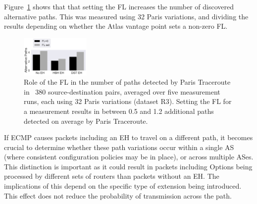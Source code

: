 \documentclass[conference]{IEEEtran}
\begin{document}
Figure~\ref{fig:paths-fl} shows that that setting the FL increases the number of discovered alternative paths.
This was measured using 32 Paris variations, and dividing the results depending on whether the Atlas vantage point sets a non-zero FL.

\begin{figure}[t]
\centering
  \includegraphics[width=0.3\textwidth]{FL.png}
  \caption{Role of the FL in the number of paths detected by Paris Traceroute in ~380
source-destination pairs, averaged over five measurement runs, each using 32 Paris variations (dataset R3). Setting the FL for a measurement results in between 0.5 and 1.2 additional paths detected on average by Paris Traceroute.}
  \label{fig:paths-fl}
\end{figure}




If ECMP causes packets including an EH to travel on a different path, it
becomes crucial to determine whether these path variations occur within a
single AS (where consistent configuration policies may be in
place), or across multiple ASes. This distinction is important as it could
result in packets including Options being processed by different sets of routers than packets
without an EH. The implications of this depend on the specific type of
extension being introduced. This effect
does not reduce the probability of transmission across the path.
\end{document}
